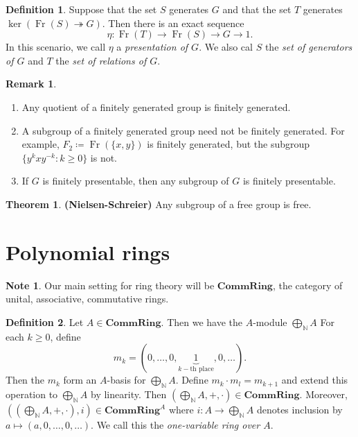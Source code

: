 \documentclass[10pt,letterpaper,cm]{nupset}
\theoremstyle{definition}
\newtheorem*{definition}{Definition}
\newtheorem{note}{Note}
\newtheorem{remark}{Remark}
\newtheorem{theorem}{Theorem}
\newcommand{\N}{\mathbb N}
\newcommand{\1}{\mathbf{1}}
\newcommand{\0}{\vec 0}
\DeclareMathOperator{\Fr}{Fr}
\begin{document}
\begin{definition}
Suppose that the set $S$ generates $G$ and that the set $T$ generates $\ker(\Fr(S) \twoheadrightarrow G)$. Then there is an exact sequence $$\eta :  \Fr(T) \to \Fr(S) \to G \to 1.$$ In this scenario, we call $\eta$ a \textit{presentation of $G$}. We also cal $S$ the \textit{set of generators of $G$} and $T$ the \textit{set of relations of $G$}.
\end{definition}

\begin{remark} $ $
\begin{enumerate}
\item Any quotient of a finitely generated group is finitely generated.
\item A subgroup of a finitely generated group need not be finitely generated. For example, $F_2\coloneqq \Fr(\{x,y\})$ is finitely generated, but the subgroup $\{y^kxy^{-k} : k \geq 0\}$ is not.
\item If $G$ is finitely presentable, then any subgroup of $G$ is finitely presentable.
\end{enumerate}  
\end{remark}

\begin{theorem}{\textbf{(Nielsen-Schreier)}}
Any subgroup of a free group is free.
\end{theorem}

\section{Polynomial rings}

\begin{note}
Our main setting for ring theory will be $\mathbf{CommRing}$, the category of unital, associative, commutative rings.
\end{note}

\begin{definition}
Let $A \in \mathbf{CommRing}$. Then we have the $A$-module $\bigoplus_{\N} A$ For each $k\geq 0$, define $$m_k = (0, \ldots, 0, \underbrace{1}_{k-\text{th place}}, 0 , \ldots).$$ Then the $m_k$ form an $A$-basis for  $\bigoplus_{\N} A$. Define $m_k \cdot m_l = m_{k+1}$ and extend this operation to $\bigoplus_{\N} A$ by linearity. Then $(\bigoplus_{\N} A, + , \cdot) \in  \mathbf{CommRing}$. Moreover, $((\bigoplus_{\N} A, + , \cdot), i) \in  \mathbf{CommRing}^A$ where $i : A \to \bigoplus_{\N}A$ denotes inclusion by $a \mapsto (a, 0, \ldots, 0, \ldots)$. We call this the \textit{one-variable ring over $A$}.
\end{definition}
\end{document}
